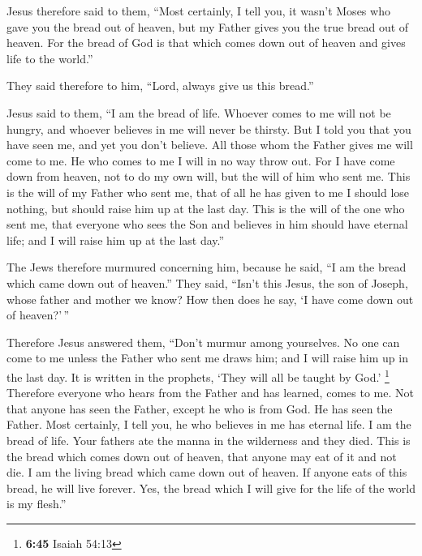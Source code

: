 \begin{paracol}{2}
\begin{otherlanguage}{english}
 Jesus therefore said to them, ``Most certainly, I tell
you, it wasn't Moses who gave you the bread out of heaven, but my Father
gives you the true bread out of heaven.  For the bread of
God is that which comes down out of heaven and gives life to the
world.''

 They said therefore to him, ``Lord, always give us this
bread.''

 Jesus said to them, ``I am the bread of life. Whoever
comes to me will not be hungry, and whoever believes in me will never be
thirsty.  But I told you that you have seen me, and yet
you don't believe.  All those whom the Father gives me
will come to me. He who comes to me I will in no way throw out.
 For I have come down from heaven, not to do my own will,
but the will of him who sent me.  This is the will of my
Father who sent me, that of all he has given to me I should lose
nothing, but should raise him up at the last day.  This
is the will of the one who sent me, that everyone who sees the Son and
believes in him should have eternal life; and I will raise him up at the
last day.''

 The Jews therefore murmured concerning him, because he
said, ``I am the bread which came down out of heaven.'' 
They said, ``Isn't this Jesus, the son of Joseph, whose father and
mother we know? How then does he say, `I have come down out of
heaven?'\,''

 Therefore Jesus answered them, ``Don't murmur among
yourselves.  No one can come to me unless the Father who
sent me draws him; and I will raise him up in the last day.
 It is written in the prophets, `They will all be taught
by God.' \footnote{\textbf{6:45} Isaiah 54:13} Therefore everyone who
hears from the Father and has learned, comes to me.  Not
that anyone has seen the Father, except he who is from God. He has seen
the Father.  Most certainly, I tell you, he who believes
in me has eternal life.  I am the bread of life.
 Your fathers ate the manna in the wilderness and they
died.  This is the bread which comes down out of heaven,
that anyone may eat of it and not die.  I am the living
bread which came down out of heaven. If anyone eats of this bread, he
will live forever. Yes, the bread which I will give for the life of the
world is my flesh.''


\end{otherlanguage}
\end{paracol}
